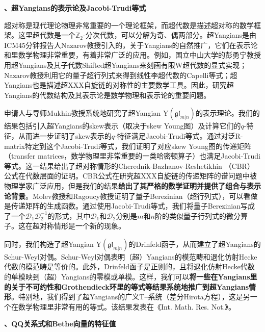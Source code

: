 \documentclass[12pt,UTF8,AutoFakeBold=4,a4paper]{ctexart}
\begin{document}
\medskip

\textbf{、超Yangians的表示论及Jacobi-Trudi等式}

超对称是现代理论物理非常重要的一个理论框架，而超代数是描述超对称的数学框架。这里超代数是一个$\mathbb Z_2$-分次代数，可以分解为奇、偶两部分。超Yangians是由ICM45分钟报告人Nazarov教授引入的，关于Yangians的自然推广，它们在表示论和里数学物理非常重要，有着非常广泛的应用。例如，国立中山大学的彭勇宁教授用超Yangians及其子代数Shifted超Yangians来刻画有限W超代数的显式实现；Nazarov教授利用它的量子超行列式来得到线性李超代数的Capelli等式；超Yangians也是描述超XXX自旋链的对称性的主要数学工具。因此，研究超Yangians的代数结构及其表示论是数学物理和表示论的重要问题。

申请人与导师Mukhin教授系统地研究了超Yangian $\mathrm{Y}(\mathfrak{gl}_{m|n})$的表示理论。我们的结果包括引入超Yangians的skew表示（取决于skew Young图）及计算它们的$q$-特征，从而进一步证明了skew表示的$q$-特征满足Jacobi-Trudi等式。通过对泛R-matrix特定到这个Jacobi-Trudi等式，我们证明了对应skew Young图的传递矩阵（transfer matrices，数学物理里非常重要的一类哈密顿算子）也满足Jacobi-Trudi等式。这一结果给出了超对称情形的Cherednik-Bazhanov-Reshetikhin （CBR）公式在代数层面的证明。CBR公式在研究超XXX自旋链的传递矩阵的谱问题中被物理学家广泛应用，但是我们的结果\textbf{给出了其严格的数学证明并提供了组合与表示论背景}。Molev教授和Ragoucy教授证明了量子Berezinian（超行列式），可以看做是传递矩阵的生成函数。通过使用Jacobi-Trudi等式，我们将量子Berezinian写成了一个$\mathcal D_1\mathcal D_2^{-1}$的形式，其中$\mathcal D_1$和$\mathcal D_2$分别是$m$和$n$阶的类似量子行列式的微分算子。这在超对称情形是一个新的现象。

同时，我们构造了超Yangian $\mathrm{Y}(\mathfrak{gl}_{m|n})$的Drinfeld函子，从而建立了超Yangians的Schur-Weyl对偶。Schur-Weyl对偶表明（超）Yangians的模范畴和退化仿射Hecke代数的模范畴是等价的。此外，Drinfeld函子是正则的，且将退化仿射Hecke代数的单模映到（超）Yangians的零模或单模。这样，我们可以\textbf{将一些在Yangians里的关于不可约性和Grothendieck环里的等式等结果系统地推广到超Yangians情形}。特别地，我们得到了超Yangians的广义T--系统（差分Hirota方程），这是另一个在数学物理里非常有用的等式。该结果发表在《Int. Math. Res. Not.》。


\medskip

\textbf{、QQ关系式和Bethe向量的特征值}
\end{document}
